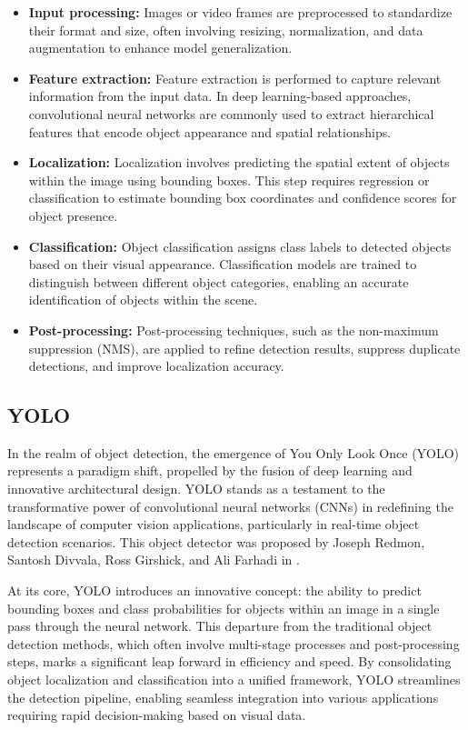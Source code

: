 \begin{itemize}
  \item \textbf{Input processing:} Images or video frames are preprocessed to standardize their format and size, often
involving resizing, normalization, and data augmentation to enhance model generalization.
  \item \textbf{Feature extraction:} Feature extraction is performed to capture relevant information from the input
  data. In deep learning-based approaches, convolutional neural networks are commonly used to extract hierarchical features that encode object appearance and spatial relationships.
  \item \textbf{Localization:} Localization involves predicting the spatial extent of objects within the image using
bounding boxes. This step requires regression or classification to estimate bounding box coordinates and confidence scores for object presence.
  \item \textbf{Classification:} Object classification assigns class labels to detected objects based on their visual
  appearance. Classification models are trained to distinguish between different object categories, enabling an accurate identification of objects within the scene.
  \item \textbf{Post-processing:} Post-processing techniques, such as the non-maximum suppression (NMS), are applied to
  refine detection results, suppress duplicate detections, and improve localization accuracy.
\end{itemize}



  \subsection{YOLO}
In the realm of object detection, the emergence of You Only Look Once (YOLO) represents a paradigm shift, propelled by the fusion of deep learning and innovative architectural design. YOLO stands as a testament to the transformative power of convolutional neural networks (CNNs) in redefining the landscape of computer vision applications, particularly in real-time object detection scenarios. This object detector was proposed by Joseph Redmon, Santosh Divvala, Ross Girshick, and Ali Farhadi in \cite{YOLORedmon2016}.

At its core, YOLO introduces an innovative concept: the ability to predict bounding boxes and class probabilities for objects within an image in a single pass through the neural network. This departure from the traditional object detection methods, which often involve multi-stage processes and post-processing steps, marks a significant leap forward in efficiency and speed. By consolidating object localization and classification into a unified framework, YOLO streamlines the detection pipeline, enabling seamless integration into various applications requiring rapid decision-making based on visual data.


